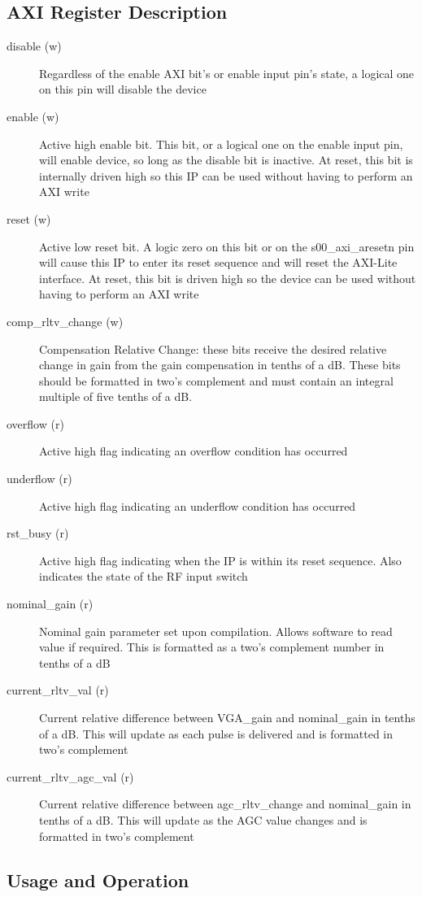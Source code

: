 \documentclass[11pt]{article}
\begin{document}
\subsection{AXI Register Description}
\begin{description}
	\item[disable (w)]Regardless of the enable AXI bit's or enable input pin's state, a logical one on this pin will disable the device
	\item[enable (w)]Active high enable bit. This bit, or a logical one on the enable input pin, will enable device, so long as the disable bit is
		inactive. At reset, this bit is internally driven high so this IP can be used without having to perform an AXI write
	\item[reset (w)]Active low reset bit. A logic zero on this bit or on the s00\_axi\_aresetn pin will cause this IP to enter its reset sequence and
		will reset the AXI-Lite interface. At reset, this bit is driven high so the device can be used without having to perform an AXI write
	\item[comp\_rltv\_change (w)]Compensation Relative Change: these bits receive the desired relative change in gain from the gain compensation in tenths
		of a dB. These bits should be formatted in two's complement and must contain an integral multiple of five tenths of a dB.
	\item[overflow (r)]Active high flag indicating an overflow condition has occurred
	\item[underflow (r)]Active high flag indicating an underflow condition has occurred
	\item[rst\_busy (r)]Active high flag indicating when the IP is within its reset sequence. Also indicates the state of the RF input switch
	\item[nominal\_gain (r)]Nominal gain parameter set upon compilation. Allows software to read value if required. This is formatted as a two's
		complement number in tenths of a dB
	\item[current\_rltv\_val (r)]Current relative difference between VGA\_gain and nominal\_gain in tenths of a dB. This will update as each pulse is
		delivered and is formatted in two's complement
	\item[current\_rltv\_agc\_val (r)]Current relative difference between agc\_rltv\_change and nominal\_gain in tenths of a dB. This will update as the
		AGC value changes and is formatted in two's complement
\end{description}
\subsection{Usage and Operation}
\end{document}

